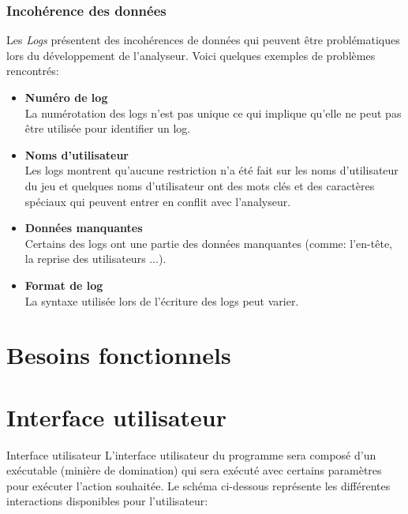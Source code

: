 \documentclass{scrreprt}
\begin{document}
\subsubsection{Incohérence des données}
Les \textit{Logs} présentent des incohérences de données qui peuvent être problématiques lors du développement de l'analyseur. Voici quelques exemples de problèmes rencontrés:

\begin{itemize}
  \item \textbf{Numéro de log}\\
   La numérotation des logs n'est pas unique ce qui implique qu'elle ne peut pas être utilisée pour identifier un log.
  \item \textbf{Noms d'utilisateur}\\
    Les logs montrent qu'aucune restriction n’a été fait sur les noms d'utilisateur du jeu et quelques noms d'utilisateur ont des mots clés et des caractères spéciaux qui peuvent entrer en conflit avec l'analyseur.
   \item \textbf{Données manquantes}\\
    Certains des logs ont une partie des données manquantes (comme: l'en-tête, la reprise des utilisateurs $\ldots$).
   \item \textbf{Format de log}\\
    La syntaxe utilisée lors de l'écriture des logs peut varier.
\end{itemize}

\section{Besoins fonctionnels}
\iffalse
\section{Interface utilisateur}
  Interface utilisateur
L'interface utilisateur du programme sera composé d'un exécutable (minière de domination) qui sera exécuté avec certains paramètres pour exécuter l'action souhaitée. Le schéma ci-dessous représente les différentes interactions disponibles pour l'utilisateur:\\
\end{document}

